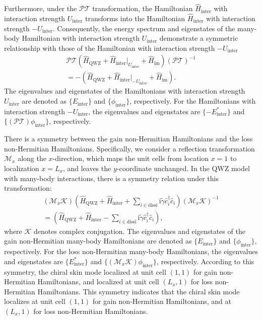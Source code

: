 \documentclass[longbibliography, aps, prx, amsmath, amssymb, amsfonts, twocolumn,superscriptaddress, footinbib]{revtex4-1}
\begin{document}
	Furthermore, under the $\mathcal{PT}$ transformation, the Hamiltonian $\hat{H}_{\text{inter}}$ with interaction strength $U_{\text{inter}}$ transforms into the Hamiltonian $\hat{H}_{\text{inter}}$ with interaction strength $-U_{\text{inter}}$. Consequently, the energy spectrum and eigenstates of the many-body Hamiltonian with interaction strength $U_{\text{inter}}$ demonstrate a symmetric relationship with those of the Hamiltonian with interaction strength $-U_{\text{inter}}$
	\begin{equation}
		\begin{split}
			\mathcal{PT} (\hat{H}_{\text{QWZ}}+\hat{H}_{\text{inter}}\vert_{U_{\text{inter}}}+\hat{H}_{\text{im}}) (\mathcal{PT})^{-1}\\
			= -(\hat{H}_{\text{QWZ}}+\hat{H}_{\text{inter}}\vert_{-U_{\text{inter}}}+\hat{H}_{\text{im}}).
		\end{split}
	\end{equation}
	The eigenvalues and eigenstates of the Hamiltonians with interaction strength $U_{\text{inter}}$ are denoted as $\{E_{\text{inter}}\}$ and $\{\phi_{\text{inter}}\}$, respectively. For the Hamiltonians with interaction strength $-U_{\text{inter}}$, the eigenvalues and eigenstates are $\{-E_{\text{inter}}^*\}$ and $\{(\mathcal{PT})\phi_{\text{inter}}\}$, respectively.
	
	There is a symmetry between the gain non-Hermitian Hamiltonians and the loss non-Hermitian Hamiltonians. Specifically, we consider a reflection transformation $\mathcal{M}_x$ along the $x$-direction, which maps the unit cells from location $x = 1$ to localization $x = L_x$, and leaves the $y$-coordinate unchanged. In the QWZ model with many-body interactions, there is a symmetry relation under this transformation:
	\begin{equation}
		\begin{split}
			(\mathcal{M}_x \mathcal{K})(\hat{H}_{\text{QWZ}} + \hat{H}_{\text{inter}} + \sum_{i\in \text{dissi}} \mathrm{i}\tilde{\gamma} \hat{c}_i^{\dagger} \hat{c}_i ) (\mathcal{M}_x \mathcal{K})^{-1} \\
			= (\hat{H}_{\text{QWZ}} + \hat{H}_{\text{inter}} - \sum_{i\in \text{dissi}} \mathrm{i}\tilde{\gamma} \hat{c}_i^{\dagger} \hat{c}_i),
		\end{split}
	\end{equation}
	where $\mathcal{K}$ denotes complex conjugation. 
	The eigenvalues and eigenstates of the gain non-Hermitian many-body Hamiltonians are denoted as $\{E_{\text{inter}}\}$ and $\{\phi_{\text{inter}}\}$, respectively. For the loss non-Hermitian many-body Hamiltonians, the eigenvalues and eigenstates are $\{E_{\text{inter}}^*\}$ and $\{(\mathcal{M}_x\mathcal{K})\phi_{\text{inter}}\}$, respectively. 
	According to this symmetry, the chiral skin mode localized at unit cell $(1,1)$ for gain non-Hermitian Hamiltonians, and localized at unit cell $(L_x,1)$ for loss non-Hermitian Hamiltonians.
	This symmetry indicates that the chiral skin mode localizes at unit cell $(1,1)$ for gain non-Hermitian Hamiltonians, and at $(L_x,1)$ for loss non-Hermitian Hamiltonians.
\end{document}
